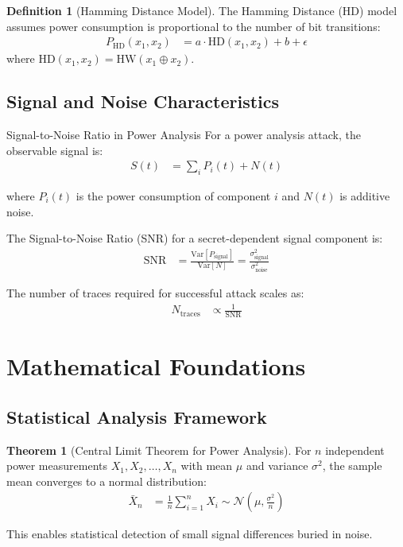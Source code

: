 \documentclass[11pt,a4paper]{article}
\theoremstyle{definition}
\newtheorem{definition}{Definition}[section]
\newtheorem{theorem}{Theorem}[section]
\begin{document}
\begin{definition}[Hamming Distance Model] 
The Hamming Distance (HD) model assumes power consumption is proportional to the number of bit transitions:
\begin{align}
P_{\text{HD}}(x_1, x_2) &= a \cdot \text{HD}(x_1, x_2) + b + \epsilon
\end{align}
where $\text{HD}(x_1, x_2) = \text{HW}(x_1 \oplus x_2)$.
\end{definition}

\subsection{Signal and Noise Characteristics}

\begin{mathematicsbox}{Signal-to-Noise Ratio in Power Analysis}
For a power analysis attack, the observable signal is:
\begin{align}
S(t) &= \sum_{i} P_i(t) + N(t)
\end{align}

where $P_i(t)$ is the power consumption of component $i$ and $N(t)$ is additive noise.

The Signal-to-Noise Ratio (SNR) for a secret-dependent signal component is:
\begin{align}
\text{SNR} &= \frac{\text{Var}[P_{\text{signal}}]}{\text{Var}[N]} = \frac{\sigma_{\text{signal}}^2}{\sigma_{\text{noise}}^2}
\end{align}

The number of traces required for successful attack scales as:
\begin{align}
N_{\text{traces}} &\propto \frac{1}{\text{SNR}}
\end{align}
\end{mathematicsbox}

\section{Mathematical Foundations}

\subsection{Statistical Analysis Framework}

\begin{theorem}[Central Limit Theorem for Power Analysis]
For $n$ independent power measurements $X_1, X_2, \ldots, X_n$ with mean $\mu$ and variance $\sigma^2$, the sample mean converges to a normal distribution:
\begin{align}
\bar{X}_n &= \frac{1}{n}\sum_{i=1}^n X_i \sim \mathcal{N}\left(\mu, \frac{\sigma^2}{n}\right)
\end{align}

This enables statistical detection of small signal differences buried in noise.
\end{theorem}
\end{document}
